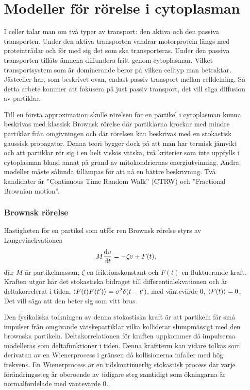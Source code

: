 \section{Modeller för rörelse i cytoplasman}
I celler talar man om två typer av transport: den aktiva och den
passiva transporten. Under den aktiva transporten vandrar motorprotein
längs med proteintrådar och för med sig det som ska transporteras.
Under den passiva transporten tillåts ämnena diffundera fritt genom
cytoplasman. Vilket transportsystem som är dominerande beror på vilken
celltyp man betraktar. Jästceller har, som beskrivet ovan, endast
passiv transport mellan celldelning. Så detta arbete kommer att
fokusera på just passiv transport, det vill säga diffusion av partiklar. 

Till en första approximation skulle rörelsen för en partikel i cytoplasman kunna beskrivas med klassisk Brownsk rörelse där partiklarna krockar med mindre partiklar från omgivningen och där rörelsen kan beskrivas med en stokastisk gaussisk propagator. Denna teori bygger dock på att man har termisk jämvikt och att partiklar rör sig i en helt viskös vätska, två kriterier som inte uppfylls i cytoplasman bland annat på grund av mitokondriernas energiutvinning. Andra modeller måste sålunda tillämpas för att nå en bättre beskrivning. Två kandidater är ''Continuous Time Random Walk'' (CTRW) och ''Fractional Brownian motion''.


\subsubsection{Brownsk rörelse}
Hastigheten för en partikel som utför ren Brownsk rörelse styrs av
Langevinekvationen~\cite{Mazo_Brownian2002} 
\begin{equation} \label{eq:Brownian_SDE}
    M\dv{v}{t}=-\zeta v + F(t),
\end{equation}
där $M$ är partikelmassan, $\zeta$ en friktionskonstant och $F(t)$ en
fluktuerande kraft. Kraften utgör här det stokastiska bidraget till
differentialekvationen och är deltakorrelerat i tiden,
$\ev{F(t)F(t')}=\sigma^2\delta(t-t')$, 
med väntevärde 0, $\ev{F(t)}=0$. 
Det vill säga att den beter sig som vitt brus. 

Den fysikaliska tolkningen av denna stokastiska kraft är att partikeln får små impulser från omgivande vätskepartiklar vilka kolliderar slumpmässigt med den brownska partikeln.  Deltakorrelationen för kraften uppkommer då impulserna modelleras som deltafunktioner i tiden. Denna kraftterm kan vidare tolkas som derivatan av en Wienerprocess i gränsen då kollisionerna infaller med hög frekvens. En Wienerprocess är en tidskontinuerlig stokastisk process där varje förändringssteg är oberoende av tidigare steg samtidigt som ökningarna är normalfördelade med väntevärde 0..

